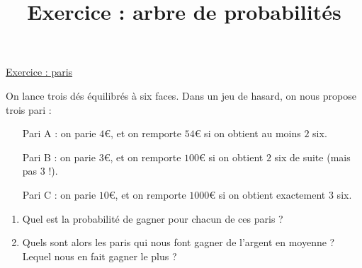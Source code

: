 \documentclass{automatisme}
\title{Exercice : arbre de probabilités}
\begin{document}
\begin{frame}
	{\Large \uline{Exercice : paris}}

	\vspace*{-0.5cm}On lance trois dés équilibrés à six faces. Dans un jeu de hasard, on nous propose trois pari :

	\begin{itemize}
		\item[Pari A]\hspace*{-0.5em}: on parie $4$€, et on remporte $54$€ si on obtient au moins $2$ six. %
		\item[Pari B]\hspace*{-0.5em}: on parie $3$€, et on remporte $100$€ si on obtient $2$ six de suite (mais pas $3$ !). %
		\item[Pari C]\hspace*{-0.5em}: on parie $10$€, et on remporte $1000$€ si on obtient exactement $3$ six. %
	\end{itemize} \bigskip

	\begin{enumerate}
		\item Quel est la probabilité de gagner pour chacun de ces paris ?
		\item Quels sont alors les paris qui nous font gagner de l'argent en moyenne ? Lequel nous en fait gagner le plus ?
	\end{enumerate}
\end{frame}
\end{document}
